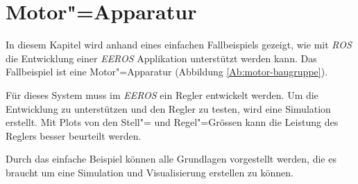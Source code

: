 \chapter{Motor"=Apparatur}
\label{chap:motor}


In diesem Kapitel wird anhand eines einfachen Fallbeispiels gezeigt, wie mit \textit{ROS} die Entwicklung einer \textit{EEROS} Applikation unterstützt werden kann. 
Das Fallbeispiel ist eine Motor"=Apparatur (Abbildung \ref{Ab:motor-baugruppe}).

Für dieses System muss im \textit{EEROS} ein Regler entwickelt werden.
Um die Entwicklung zu unterstützen und den Regler zu testen, wird eine Simulation erstellt.
Mit Plots von den Stell"= und Regel"=Grössen kann die Leistung des Reglers besser beurteilt werden.


Durch das einfache Beispiel können alle Grundlagen vorgestellt werden, die es braucht um eine Simulation und Visualisierung erstellen zu können.


